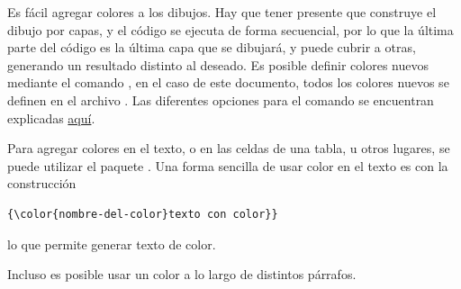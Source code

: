 Es f\'acil agregar colores a los dibujos.   Hay que tener presente que
 construye el dibujo por capas, y el c\'odigo se ejecuta de forma
secuencial, por lo que la \'ultima parte del c\'odigo es la \'ultima capa que se
dibujar\'a, y puede cubrir a otras, generando un resultado distinto al deseado.
Es posible definir colores nuevos mediante el comando
, en el caso de este documento, todos los
colores nuevos se definen en el archivo .   Las diferentes
opciones para el comando  se encuentran
explicadas \href{https://en.wikibooks.org/wiki/LaTeX/Colors}{aqu\'i}.

Para agregar colores en el texto, o en las celdas de una tabla, u otros lugares,
se puede utilizar el paquete
\href{https://ctan.org/pkg/xcolor}{}.  Una forma
sencilla de usar color en el texto es con la construcci\'on
\begin{lstlisting}
{\color{nombre-del-color}texto con color}}
\end{lstlisting}
{\color{verdeAzulado}lo que permite generar texto de color.

Incluso es posible usar un color a lo largo de distintos p\'arrafos.}


